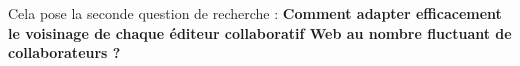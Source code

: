 
Cela pose la seconde question de recherche : \textbf{Comment adapter
  efficacement le voisinage de chaque éditeur collaboratif Web au nombre
  fluctuant de collaborateurs ?}


